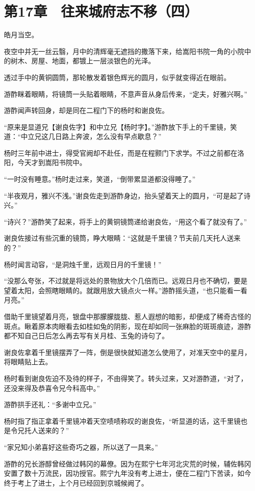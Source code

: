 \section{第17章　往来城府志不移（四）}

皓月当空。

夜空中并无一丝云翳，月中的清辉毫无遮挡的撒落下来，给嵩阳书院一角的小院中的树木、房屋、地面，都镀上一层淡银色的光泽。

透过手中的黄铜圆筒，那轮散发着银色辉光的圆月，似乎就变得近在眼前。

游酢眯着眼睛，将镜筒一头贴着眼睛，不意声音从身后传来，“定夫，好雅兴啊。”

游酢闻声转回身，却是同在二程门下的杨时和谢良佐。

“原来是显道兄【谢良佐字】和中立兄【杨时字】。”游酢放下手上的千里镜，笑道：“中立兄这几日路上奔波，怎么没有早点歇息？”

杨时三年前中进士，得受官阙却不赴任，而是在程颢门下求学。不过之前都在洛阳，今天才到嵩阳书院中。

“一时没有睡意。”杨时走过来，笑道，“倒带累显道都没得睡了。”

“半夜观月，雅兴不浅。”谢良佐走到游酢身边，抬头望着天上的圆月，“可是起了诗兴。”

“诗兴？”游酢笑了起来，将手上的黄铜镜筒递给谢良佐，“用这个看了就没有了。”

谢良佐接过有些沉重的镜筒，睁大眼睛：“这就是千里镜？节夫前几天托人送来的？”

杨时闻言动容，“是洞烛千里，远观日月的千里镜！”

“没那么夸张，不过就是将远处的景物放大个几倍而已。远观日月也不确切，要是望着太阳，会照瞎眼睛的。就跟用放大镜点火一样。”游酢摇头道，“也只能看一看月亮。”

借助千里镜望着月亮，银盘中那朦朦胧胧、惹人遐想的暗影，却便成了稀奇古怪的斑点。瞅着原本肉眼看去如桂如兔的阴影，现在却如同一张麻脸的斑斑痕迹，游酢都不知自己日后怎么再去写有关月桂、玉兔的诗句了。

谢良佐拿着千里镜摆弄了一阵，倒是很快就知道怎么使用了，对准天空中的星月，将眼睛贴上去。

杨时看到谢良佐迫不及待的样子，不由得笑了。转头过来，又对游酢道，“对了，还没来得及恭喜令兄今科高中。”

游酢拱手还礼：“多谢中立兄。”

杨时指了指正拿着千里镜冲着天空啧啧称叹的谢良佐，“听显道的话，这千里镜也是令兄托人送来的？”

“家兄知小弟喜好这些奇巧之器，所以送了一具来。”

游酢的兄长游醇曾经做过韩冈的幕僚。因为在熙宁七年河北灾荒的时候，辅佐韩冈安置了数十万流民，因功授官。熙宁九年没有考上进士，便在二程门下苦读，如今终于考上了进士，上个月已经回到京城候阙了。

